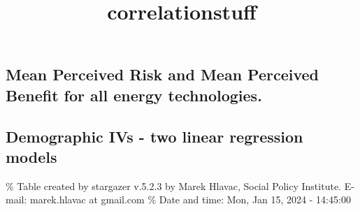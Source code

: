 \documentclass[
]{article}
\title{correlationstuff}
\author{}
\date{\vspace{-2.5em}}
\begin{document}
\maketitle

{
\setcounter{tocdepth}{2}
\tableofcontents
}
\newpage

\hypertarget{mean-perceived-risk-and-mean-perceived-benefit-for-all-energy-technologies.}{%
\subsection{Mean Perceived Risk and Mean Perceived Benefit for all
energy
technologies.}\label{mean-perceived-risk-and-mean-perceived-benefit-for-all-energy-technologies.}}

\newpage

\hypertarget{demographic-ivs---two-linear-regression-models}{%
\subsection{Demographic IVs - two linear regression
models}\label{demographic-ivs---two-linear-regression-models}}

\begingroup\setlength{\tabcolsep}{1pt}\renewcommand{\arraystretch}{0.7}

\% Table created by stargazer v.5.2.3 by Marek Hlavac, Social Policy
Institute. E-mail: marek.hlavac at gmail.com \% Date and time: Mon, Jan
15, 2024 - 14:45:00
\end{document}
